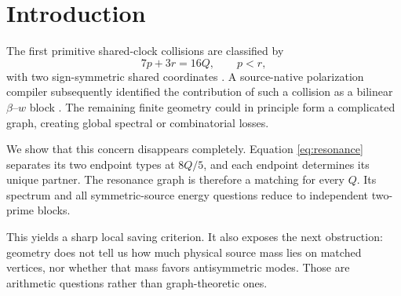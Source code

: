 \section{Introduction}

The first primitive shared-clock collisions are classified by
\begin{equation}
 7p+3r=16Q,\qquad p<r,
 \label{eq:resonance}
\end{equation}
with two sign-symmetric shared coordinates \cite{tpc226}.  A source-native polarization
compiler subsequently identified the contribution of such a collision as a bilinear
$\beta$--$w$ block \cite{tpc228}.  The remaining finite geometry could in principle
form a complicated graph, creating global spectral or combinatorial losses.

We show that this concern disappears completely.  Equation \eqref{eq:resonance}
separates its two endpoint types at $8Q/5$, and each endpoint determines its unique
partner.  The resonance graph is therefore a matching for every $Q$.  Its spectrum and
all symmetric-source energy questions reduce to independent two-prime blocks.

This yields a sharp local saving criterion.  It also exposes the next obstruction:
geometry does not tell us how much physical source mass lies on matched vertices, nor
whether that mass favors antisymmetric modes.  Those are arithmetic questions rather
than graph-theoretic ones.
